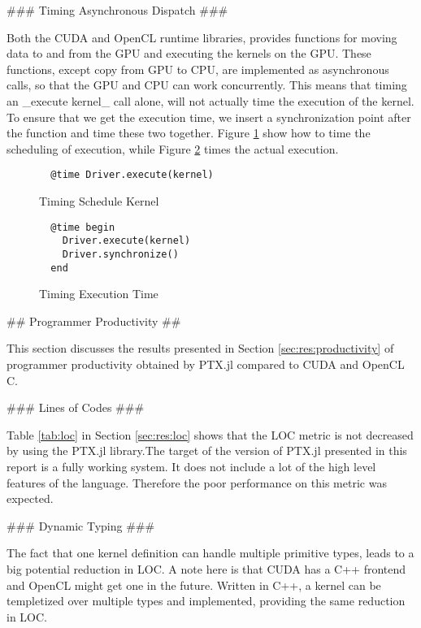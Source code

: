 \begin{markdown}
### Timing Asynchronous Dispatch ###

Both the \gls{CUDA} and \gls{OpenCL} runtime libraries, provides
functions for moving data to and from the GPU and executing the
kernels on the \gls{GPU}. These functions, except copy from GPU to
CPU, are implemented as asynchronous calls, so that the GPU and CPU
can work concurrently. This means that timing an _execute kernel_ call
alone, will not actually time the execution of the kernel. To ensure
that we get the execution time, we insert a synchronization point
after the function and time these two together. Figure
\ref{fig:disc:async-call:sched} show how to time the scheduling of
execution, while Figure \ref{fig:disc:async-call:exec} times the
actual execution.

\begin{figure}[H]
  \begin{verbatim}
  @time Driver.execute(kernel)
  \end{verbatim}
  \caption{Timing Schedule Kernel}
  \label{fig:disc:async-call:sched}
\end{figure}

\begin{figure}[H]
  \begin{verbatim}
  @time begin
    Driver.execute(kernel)
    Driver.synchronize()
  end
  \end{verbatim}
  \caption{Timing Execution Time}
  \label{fig:disc:async-call:exec}
\end{figure}


## Programmer Productivity ##

This section discusses the results presented in Section
\ref{sec:res:productivity} of programmer productivity obtained by
PTX.jl compared to CUDA and OpenCL C.

### Lines of Codes ###

Table \ref{tab:loc} in Section \ref{sec:res:loc} shows that
the LOC metric is not decreased by using the PTX.jl library.The target
of the version of PTX.jl presented in this report is a fully working
system. It does not include a lot of the high level features of the
language. Therefore the poor performance on this metric was expected.

### Dynamic Typing ###

The fact that one kernel definition can handle multiple primitive
types, leads to a big potential reduction in LOC. A note here is that
CUDA has a C++ frontend and OpenCL might get one in the
future. Written in C++, a kernel can be templetized over multiple
types and implemented, providing the same reduction in LOC.


\end{markdown}
